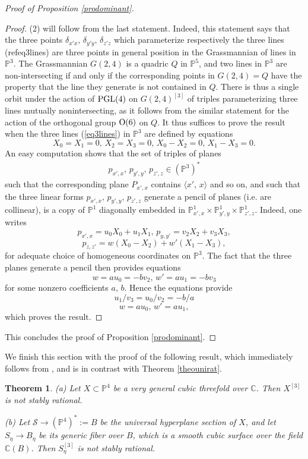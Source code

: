 \documentclass[10pt]{article}
\newtheorem{theo}{Theorem}[section]
\begin{document}
\begin{proof}[Proof of Proposition \ref{prodominant}]
\begin{proof}
 (2) will  follow from the last statement. Indeed, this statement says that the  three points $\delta_{x'x},\,\delta_{y'y},\,\delta_{z'z}$ which parameterize respectively the three  lines
(ref{eq3lines})
are three points in general position in the Grassmannian of lines in $\mathbb{P}^3$. The Grassmannian $G(2,4)$ is a quadric $Q$ in $\mathbb{P}^5$, and two lines in $\mathbb{P}^3$ are non-intersecting if and only if the corresponding points in $G(2,4)=Q$ have the property that the line they generate is not contained in $Q$.   There is  thus a single orbit  under the action of ${\rm PGL}(4)$  on $G(2,4)^{[3]}$  of triples parameterizing three lines  mutually nonintersecting, as it follows from the similar statement for the action of the orthogonal group ${\rm O}(6)$ on $Q$. It thus suffices to prove the result when the three lines (\ref{eq3lines}) in $\mathbb{P}^3$  are defined  by equations
$$X_0=X_1=0,\,X_2=X_3=0,\,X_0-X_2=0,\,X_1-X_3=0.$$
An easy computation shows that the set of triples of planes
\begin{eqnarray}\label{eq3planes} p_{x',x}, \,p_{y',y}, \,p_{ z',z}\in (\mathbb{P}^3)^*
\end{eqnarray}
such that the corresponding plane $P_{x',x}$ contains $\langle x',\,x\rangle$ and so on, and such that the three linear forms $p_{x',x}, \,p_{y',y}, \,p_{ z',z}$ generate a pencil of planes (i.e. are collinear),  is a copy of $\mathbb{P}^1$ diagonally embedded in $\mathbb{P}^1_{x',x}\times \mathbb{P}^1_{y',y}\times \mathbb{P}^1_{z',z}$. Indeed,
one writes   $$p_{x',x}=u_0X_0+u_1 X_1,\,p_{y,y'}=v_2X_2+v_3X_3,$$
 $$p_{z,z'}=w(X_0-X_2)+w'(X_1-X_3),$$ for adequate choice of homogeneous coordinates on $\mathbb{P}^3$. The fact that the three planes generate a pencil then provides  equations
$$ w=au_0=-bv_2,\,w'=au_1=-bv_3
$$
for some nonzero coefficients $a,\,b$. Hence the equations provide
$$u_1/v_3=u_0/v_2=-b/a$$
$$w=au_0,\,w'=au_1,$$
which proves the result.
\end{proof}
This concludes the proof of Proposition \ref{prodominant}.
\end{proof}
We finish this section with the proof of the following result, which immediately follows from \cite{SEggay}, and is in contrast with Theorem \ref{theounirat}.
\begin{theo} \label{propassr} (a) Let $X\subset \mathbb{P}^4$ be a very general cubic threefold over $\mathbb{C}$. Then $X^{[3]}$ is not stably rational.

(b) Let $\mathcal{S}\rightarrow (\mathbb{P}^4)^*:=B$ be the universal hyperplane section of $X$, and let $S_\eta\rightarrow B_\eta$ be its generic fiber over $B$, which is a smooth cubic surface over the field $\mathbb{C}(B)$. Then $S_\eta^{[3]}$ is not stably rational.
\end{theo}
\end{document}
